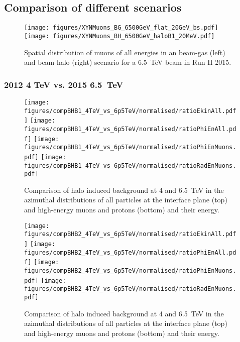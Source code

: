 \subsection{Comparison of different scenarios}



\begin{figure}
  \centering
    \texttt{[image: figures/XYNMuons\_BG\_6500GeV\_flat\_20GeV\_bs.pdf]}
    \texttt{[image: figures/XYNMuons\_BH\_6500GeV\_haloB1\_20MeV.pdf]}
  \caption{Spatial distribution of muons of all energies in an beam-gas (left) and beam-halo (right) scenario for a 6.5~TeV beam in Run II 2015.
    \label{fig:XYNMuons}}
\end{figure}

\subsubsection{2012 4 TeV vs. 2015 6.5~TeV}
\begin{figure}
\begin{center}
  \texttt{[image: figures/compBHB1\_4TeV\_vs\_6p5TeV/normalised/ratioEkinAll.pdf]}
  \texttt{[image: figures/compBHB1\_4TeV\_vs\_6p5TeV/normalised/ratioPhiEnAll.pdf]}
  \texttt{[image: figures/compBHB1\_4TeV\_vs\_6p5TeV/normalised/ratioPhiEnMuons.pdf]}
  \texttt{[image: figures/compBHB1\_4TeV\_vs\_6p5TeV/normalised/ratioRadEnMuons.pdf]}
\end{center}
\vspace{-0.6cm}
 \caption{Comparison of halo induced background at 4 and 6.5~TeV in the azimuthal distributions of all particles at the interface plane (top) and high-energy muons and protons (bottom) and their energy.
  \label{compBHB1run1run2}}
\end{figure}

\begin{figure}%
\begin{center}
  \texttt{[image: figures/compBHB2\_4TeV\_vs\_6p5TeV/normalised/ratioEkinAll.pdf]}
  \texttt{[image: figures/compBHB2\_4TeV\_vs\_6p5TeV/normalised/ratioPhiEnAll.pdf]}
  \texttt{[image: figures/compBHB2\_4TeV\_vs\_6p5TeV/normalised/ratioPhiEnMuons.pdf]}
  \texttt{[image: figures/compBHB2\_4TeV\_vs\_6p5TeV/normalised/ratioRadEnMuons.pdf]}
\end{center}
\vspace{-0.6cm}
 \caption{Comparison of halo induced background at 4 and 6.5~TeV in the azimuthal distributions of all particles at the interface plane (top) and high-energy muons and protons (bottom) and their energy.
  \label{compBHB2run1run2}}
\end{figure}



